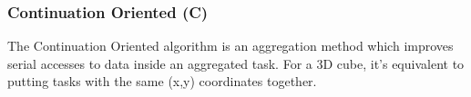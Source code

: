 \subsubsection{Continuation Oriented (C)}
The Continuation Oriented algorithm is an aggregation method which improves 
serial accesses to data inside an aggregated task. For a 3D cube,
it's equivalent to putting tasks with the same (x,y) coordinates together.

